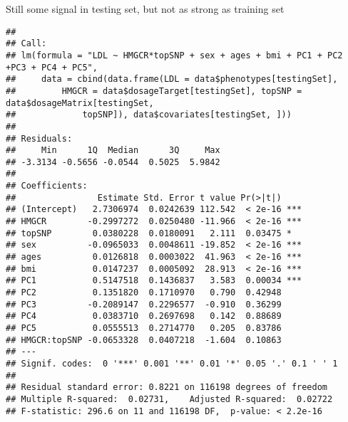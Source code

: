 \documentclass[]{article}
\newenvironment{Shaded}{\begin{snugshade}}{\end{snugshade}}
\newcommand{\KeywordTok}[1]{\textcolor[rgb]{0.13,0.29,0.53}{\textbf{#1}}}
\newcommand{\DataTypeTok}[1]{\textcolor[rgb]{0.13,0.29,0.53}{#1}}
\newcommand{\StringTok}[1]{\textcolor[rgb]{0.31,0.60,0.02}{#1}}
\newcommand{\CommentTok}[1]{\textcolor[rgb]{0.56,0.35,0.01}{\textit{#1}}}
\newcommand{\OperatorTok}[1]{\textcolor[rgb]{0.81,0.36,0.00}{\textbf{#1}}}
\newcommand{\NormalTok}[1]{#1}
\begin{document}
Still some signal in testing set, but not as strong as training set

\begin{Shaded}
\end{Shaded}

\begin{verbatim}
## 
## Call:
## lm(formula = "LDL ~ HMGCR*topSNP + sex + ages + bmi + PC1 + PC2 +PC3 + PC4 + PC5", 
##     data = cbind(data.frame(LDL = data$phenotypes[testingSet], 
##         HMGCR = data$dosageTarget[testingSet], topSNP = data$dosageMatrix[testingSet, 
##             topSNP]), data$covariates[testingSet, ]))
## 
## Residuals:
##     Min      1Q  Median      3Q     Max 
## -3.3134 -0.5656 -0.0544  0.5025  5.9842 
## 
## Coefficients:
##                Estimate Std. Error t value Pr(>|t|)    
## (Intercept)   2.7306974  0.0242639 112.542  < 2e-16 ***
## HMGCR        -0.2997272  0.0250480 -11.966  < 2e-16 ***
## topSNP        0.0380228  0.0180091   2.111  0.03475 *  
## sex          -0.0965033  0.0048611 -19.852  < 2e-16 ***
## ages          0.0126818  0.0003022  41.963  < 2e-16 ***
## bmi           0.0147237  0.0005092  28.913  < 2e-16 ***
## PC1           0.5147518  0.1436837   3.583  0.00034 ***
## PC2           0.1351820  0.1710970   0.790  0.42948    
## PC3          -0.2089147  0.2296577  -0.910  0.36299    
## PC4           0.0383710  0.2697698   0.142  0.88689    
## PC5           0.0555513  0.2714770   0.205  0.83786    
## HMGCR:topSNP -0.0653328  0.0407218  -1.604  0.10863    
## ---
## Signif. codes:  0 '***' 0.001 '**' 0.01 '*' 0.05 '.' 0.1 ' ' 1
## 
## Residual standard error: 0.8221 on 116198 degrees of freedom
## Multiple R-squared:  0.02731,    Adjusted R-squared:  0.02722 
## F-statistic: 296.6 on 11 and 116198 DF,  p-value: < 2.2e-16
\end{verbatim}
\end{document}
